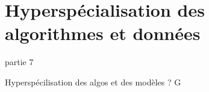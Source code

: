\section{Hyperspécialisation des algorithmes et données}

\begin{frame}{partie 7}
  \vspace{0.45cm}
  \begin{pointcle}
    \centering\large
    Hyperspécilisation des algos et des modèles ? G
  \end{pointcle}
\end{frame}

